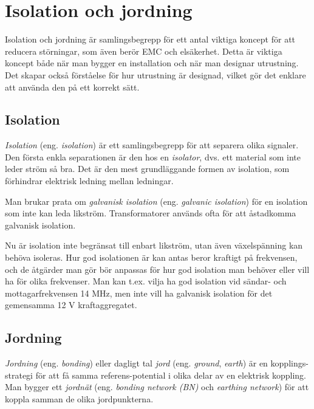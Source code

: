 \chapter{Isolation och jordning}

Isolation och jordning är samlingsbegrepp för ett antal viktiga koncept för
att reducera störningar, som även berör EMC och elsäkerhet. Detta är viktiga
koncept både när man bygger en installation och när man designar utrustning.
Det skapar också förståelse för hur utrustning är designad, vilket gör det
enklare att använda den på ett korrekt sätt.

\section{Isolation}

\emph{Isolation} (eng. \emph{isolation}) är ett samlingsbegrepp för att separera
olika signaler. Den första enkla separationen är den hos en \emph{isolator},
dvs. ett material som inte leder ström så bra. Det är den mest grundläggande
formen av isolation, som förhindrar elektrisk ledning mellan ledningar.

Man brukar prata om \emph{galvanisk isolation} (eng. \emph{galvanic isolation})
för en isolation som inte kan leda likström. Transformatorer används ofta för
att åstadkomma galvanisk isolation.

Nu är isolation inte begränsat till enbart likström, utan även växelspänning
kan behöva isoleras. Hur god isolationen är kan antas beror kraftigt på
frekvensen, och de åtgärder man gör bör anpassas för hur god isolation man
behöver eller vill ha för olika frekvenser. Man kan t.ex. vilja ha god
isolation vid sändar- och mottagarfrekvensen 14 MHz, men inte vill ha galvanisk
isolation för det gemensamma 12 V kraftaggregatet.

\section{Jordning}

\emph{Jordning} (eng. \emph{bonding}) eller dagligt tal \emph{jord} (eng.
\emph{ground}, \emph{earth}) är en kopplings-strategi för att få samma
referens-potential i olika delar av en elektrisk koppling. Man bygger ett
\emph{jordnät} (eng. \emph{bonding network (BN)} \cite[3.2.1]{K27-1991} och
\emph{earthing network}) \cite[3.1.3]{K27-1991} för att koppla samman de olika
jordpunkterna.

